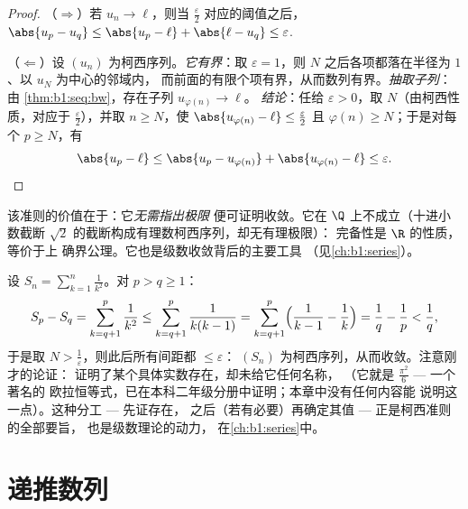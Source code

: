 \begin{proof}
（$\Rightarrow$）若 $u_n \to \ell$，则当
$\frac\varepsilon2$ 对应的阈值之后，$\abs{u_p - u_q} \leq \abs{u_p - \ell} +
\abs{\ell - u_q} \leq \varepsilon$.

（$\Leftarrow$）设 $(u_n)$ 为柯西序列。\emph{它有界}：取
$\varepsilon = 1$，则 $N$ 之后各项都落在半径为 $1$、以 $u_N$ 为中心的邻域内，
而前面的有限个项有界，从而数列有界。\emph{抽取子列}：由
\cref{thm:b1:seq:bw}，存在子列 $u_{\varphi(n)} \to \ell$。
\emph{结论}：任给 $\varepsilon > 0$，取 $N$（由柯西性质，对应于
$\frac\varepsilon2$），并取 $n \geq N$，使 $\abs{u_{\varphi(n)} - \ell}
\leq \frac\varepsilon2$ 且 $\varphi(n) \geq N$；于是对每个 $p
\geq N$，有
\[
\abs{u_p - \ell} \leq \abs{u_p - u_{\varphi(n)}} +
\abs{u_{\varphi(n)} - \ell} \leq \varepsilon . \qedhere
\]
\end{proof}

\begin{remark}
该准则的价值在于：它\emph{无需指出极限
}便可证明收敛。它在 $\Q$ 上不成立（十进小数截断
$\sqrt 2$ 的截断构成有理数柯西序列，却无有理极限）：
完备性是 $\R$ 的性质，等价于上
确界公理。它也是级数收敛背后的主要工具
（见\cref{ch:b1:series}）。
\end{remark}

\begin{example}[极限不可见的柯西序列]\label{ex:b1:seq:basel}
设 $S_n = \sum_{k=1}^{n} \frac{1}{k^2}$。对 $p > q \geq 1$：
\[
S_p - S_q = \sum_{k=q+1}^{p} \frac{1}{k^2}
\leq \sum_{k=q+1}^{p} \frac{1}{k(k-1)}
= \sum_{k=q+1}^{p} \Bigl(\frac{1}{k-1} - \frac 1k\Bigr)
= \frac 1q - \frac 1p < \frac 1q ,
\]
于是取 $N > \frac1\varepsilon$，则此后所有间距都 $\leq \varepsilon$：
$(S_n)$ 为柯西序列，从而收敛。注意刚才的论证：
证明了某个具体实数存在，却未给它任何名称，
（它就是 $\frac{\pi^2}{6}$ --- 一个著名的
欧拉恒等式，已在本科二年级分册中证明；本章中没有任何内容能
说明这一点）。这种分工 --- 先证存在，
之后（若有必要）再确定其值 --- 正是柯西准则的全部要旨，
也是级数理论的动力，
在\cref{ch:b1:series}中。
\end{example}

\section{递推数列}

